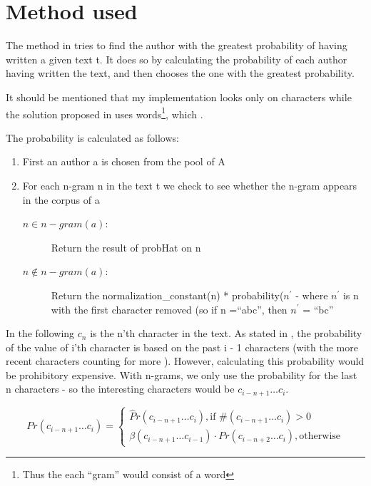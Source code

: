 \section{Method used}
\label{method}

The method in \cite{4} tries to find the author with the greatest probability of having written a given text t. It does so by calculating the probability of each author having written the text, and then chooses the one with the greatest probability.

It should be mentioned that my implementation looks only on characters while the solution proposed in \cite{nr4} uses words\footnote{Thus the each ``gram'' would consist of a word}, which   .

The probability is calculated as follows:
\begin{enumerate}it be 
\item First an author a is chosen from the pool of A 
\item For each n-gram n in the text t we check to see whether the n-gram appears in the corpus of a
\begin{description}
\item[$n \in n-gram(a)$:] Return the result of probHat on n
\item[$n \notin n-gram(a)$:] Return the normalization\_constant(n) * probability($n^\prime$ - where $n^{\prime}$ is n with the first character removed (so if n =``abc'', then $n^{\prime}$ = ``bc'' 
\end{description} 
\end{enumerate}

In the following $c_n$ is the n'th character in the text. As stated in \cite{nr4}, the probability of the value of i'th character is based on the past i - 1 characters (with the more recent characters counting for more ). However, calculating this probability would be prohibitory expensive. With n-grams, we only use the probability for the last n characters - so the interesting characters would be $c_{i - n + 1} \ldots c_{i}$.

\begin{equation*}
Pr(c_{i - n + 1} \ldots c_{i}) = \left\{
\begin{array}{rl}
\hat{P}r(c_{i - n + 1} \ldots c_{i}), \text{if } \#(c_{i - n + 1} \ldots c_{i}) > 0\\
\beta(c_{i - n + 1} \ldots c_{i-1}) \cdot Pr(c_{i - n + 2} \ldots c_{i}), \mathrm{otherwise}
\end{array} \right.
\end{equation*}

